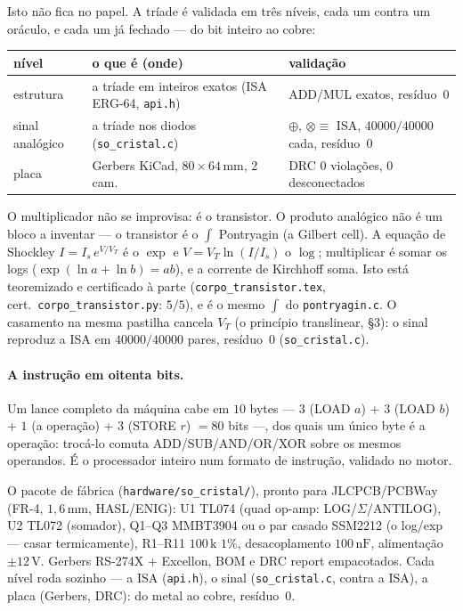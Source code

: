 \documentclass[11pt,a4paper]{article}
\begin{document}
Isto não fica no papel. A tríade é validada em três níveis, cada um contra um oráculo, e cada
um já fechado --- do bit inteiro ao cobre:

\begin{center}
\begin{tabular}{@{}lll@{}}
\toprule
nível & o que é (onde) & validação \\
\midrule
estrutura & a tríade em inteiros exatos (ISA ERG-64, \texttt{api.h}) & ADD/MUL exatos, resíduo~$0$ \\
sinal analógico & a tríade nos diodos (\texttt{so\_cristal.c}) & $\oplus$, $\otimes\equiv$ ISA, $40000/40000$ cada, resíduo~$0$ \\
placa & Gerbers KiCad, $80\times 64\,\mathrm{mm}$, $2$ cam. & DRC $0$ violações, $0$ desconectados \\
\bottomrule
\end{tabular}
\end{center}

O multiplicador não se improvisa: é o transistor. O produto analógico não é um bloco a inventar ---
o transistor é o $\displaystyle\int$ Pontryagin (a Gilbert cell). A equação de Shockley $I=I_{s}\,e^{V/V_{T}}$
é o $\exp$ e $V=V_{T}\ln(I/I_{s})$ o $\log$; multiplicar é somar os logs ($\exp(\ln a+\ln b)=ab$),
e a corrente de Kirchhoff soma. Isto está teoremizado e certificado à parte
(\texttt{corpo\_transistor.tex}, cert.\ \texttt{corpo\_transistor.py}: $5/5$), e é o mesmo $\displaystyle\int$
do \texttt{pontryagin.c}. O casamento na mesma pastilha cancela $V_{T}$ (o princípio translinear, \S3):
o sinal reproduz a ISA em $40000/40000$ pares, resíduo~$0$ (\texttt{so\_cristal.c}).

\paragraph{A instrução em oitenta bits.}
Um lance completo da máquina cabe em $10$ bytes --- $3$ (LOAD $a$) + $3$ (LOAD $b$) + $1$ (a operação)
+ $3$ (STORE $r$) $=80$ bits ---, dos quais um único byte é a operação: trocá-lo comuta
ADD/SUB/AND/OR/XOR sobre os mesmos operandos. É o processador inteiro num formato de instrução,
validado no motor.

O pacote de fábrica (\texttt{hardware/so\_cristal/}), pronto para JLCPCB/PCBWay (FR-4, $1{,}6\,\mathrm{mm}$,
HASL/ENIG): U1 TL074 (quad op-amp: LOG/$\Sigma$/ANTILOG), U2 TL072 (somador), Q1--Q3
MMBT3904 ou o par casado SSM2212 (o log/exp --- casar termicamente), R1--R11 $100\,\mathrm{k}$ $1\%$,
desacoplamento $100\,\mathrm{nF}$, alimentação $\pm 12\,\mathrm{V}$. Gerbers RS-274X + Excellon, BOM e DRC report
empacotados. Cada nível roda sozinho --- a ISA (\texttt{api.h}), o sinal (\texttt{so\_cristal.c}, contra a ISA),
a placa (Gerbers, DRC): do metal ao cobre, resíduo~$0$.
\end{document}
